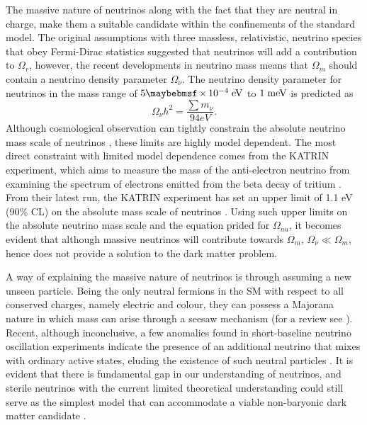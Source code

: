 The massive nature of neutrinos along with the fact that they are neutral in charge, make them a suitable candidate within the confinements of the standard model. The original assumptions with three massless, relativistic, neutrino species that obey Fermi-Dirac statistics suggested that neutrinos will add a contribution to $\Omega_{r}$, however, the recent developments in neutrino mass means that $\Omega_{m}$ should contain a neutrino density parameter $\Omega_{\nu}$. The neutrino density parameter for neutrinos in the mass range of $5 \times 10^{-4} \; \MathText{eV}$ to $1 \; \text{meV}$ is predicted as \cite{Jungman_1996}
%
\begin{equation}
    \Omega_{\nu}h^{2} = \frac{\sum{m_\nu}}{94eV}.
\end{equation}
%
Although cosmological observation can tightly constrain the absolute neutrino mass scale of neutrinos \cite{Lesgourgues_2012}, these limits are highly model dependent. The most direct constraint with limited model dependence comes from the KATRIN experiment, which aims to measure the mass of the anti-electron neutrino from examining the spectrum of electrons emitted from the beta decay of tritium \cite{katrin_experiment}. From their latest run, the KATRIN experiment has set an upper limit of 1.1 eV (90\% CL) on the absolute mass scale of neutrinos \cite{katrin_results}. Using such upper limits on the absolute neutrino mass scale and the equation prided  for $\Omega_{nu}$, it becomes evident that although massive neutrinos will contribute towards $\Omega_{m}$, $\Omega_{\nu} \ll \Omega_{m}$, hence does not provide a solution to the dark matter problem.

A way of explaining the massive nature of neutrinos is through assuming a new unseen particle. Being the only neutral fermions in the SM with respect to all conserved charges, namely electric and colour, they can possess a Majorana nature in which mass can arise through a seesaw mechanism (for a review see \cite{King_2003}). Recent, although inconclusive, a few anomalies found in short-baseline neutrino oscillation experiments indicate the presence of an additional neutrino that mixes with ordinary active states, eluding the existence of such neutral particles \cite{Gariazzo_2015, Aguilar_Arevalo_2018}. It is evident that there is fundamental gap in our understanding of neutrinos, and sterile neutrinos with the current limited theoretical understanding could still serve as the simplest model that can accommodate a viable non-baryonic dark matter candidate \cite{Dodelson_1994}.


